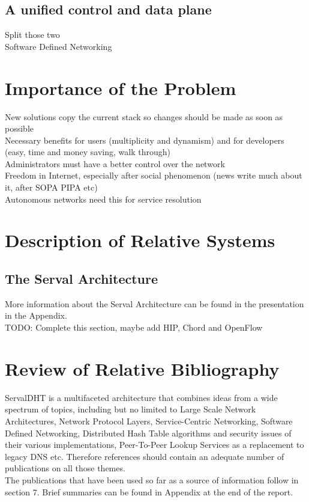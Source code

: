 \documentclass[12pt,a4paper,oneside]{article}
\begin{document}
\newpage%
\subsection{A unified control and data plane}
Split those two
\\Software Defined Networking

\newpage
\section{Importance of the Problem}
New solutions copy the current stack so changes should be made as soon as possible
\\Necessary benefits for users (multiplicity and dynamism) and for developers (easy, time and money saving, walk through)
\\Administrators must have a better control over the network
\\Freedom in Internet, especially after social phenomenon (news write much about it, after SOPA PIPA etc)
\\Autonomous networks need this for service resolution


\newpage
\section{Description of Relative Systems}
\subsection{The Serval Architecture}
More information about the Serval Architecture can be found in the presentation in the Appendix.
\\TODO: Complete this section, maybe add HIP, Chord and OpenFlow

\newpage
\section{Review of Relative Bibliography}
ServalDHT is a multifaceted architecture that combines ideas from a wide spectrum of topics, including but no limited to Large Scale Network Architectures, Network Protocol Layers, Service-Centric Networking, Software Defined Networking, Distributed Hash Table algorithms and security issues of their various implementations, Peer-To-Peer Lookup Services as a replacement to legacy DNS etc. Therefore references should contain an adequate number of publications on all those themes.\\
\indent The publications that have been used so far as a source of information follow in section 7. Brief summaries can be found in Appendix at the end of the report.
\end{document}
